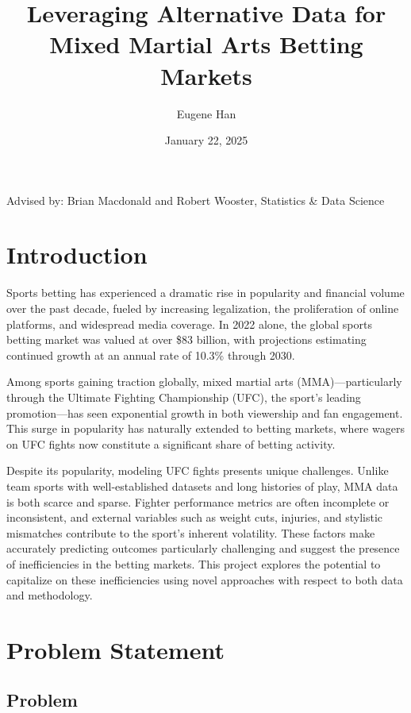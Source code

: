 \documentclass[
  letterpaper,
  DIV=11,
  numbers=noendperiod]{scrartcl}
\title{Leveraging Alternative Data for Mixed Martial Arts Betting Markets}
\author{Eugene Han}
\date{January 22, 2025}
\begin{document}
\maketitle


Advised by: Brian Macdonald and Robert Wooster, Statistics \& Data Science

\section{Introduction}\label{introduction}

Sports betting has experienced a dramatic rise in popularity and financial volume over the past decade, fueled by increasing legalization, the proliferation of online platforms, and widespread media coverage. In 2022 alone, the global sports betting market was valued at over \$83 billion, with projections estimating continued growth at an annual rate of 10.3\% through 2030.

Among sports gaining traction globally, mixed martial arts (MMA)---particularly through the Ultimate Fighting Championship (UFC), the sport’s leading promotion---has seen exponential growth in both viewership and fan engagement. This surge in popularity has naturally extended to betting markets, where wagers on UFC fights now constitute a significant share of betting activity.

Despite its popularity, modeling UFC fights presents unique challenges. Unlike team sports with well-established datasets and long histories of play, MMA data is both scarce and sparse. Fighter performance metrics are often incomplete or inconsistent, and external variables such as weight cuts, injuries, and stylistic mismatches contribute to the sport’s inherent volatility. These factors make accurately predicting outcomes particularly challenging and suggest the presence of inefficiencies in the betting markets. This project explores the potential to capitalize on these inefficiencies using novel approaches with respect to both data and methodology.

\section{Problem Statement}\label{problem-statement}

\subsection{Problem}\label{problem}
\end{document}
